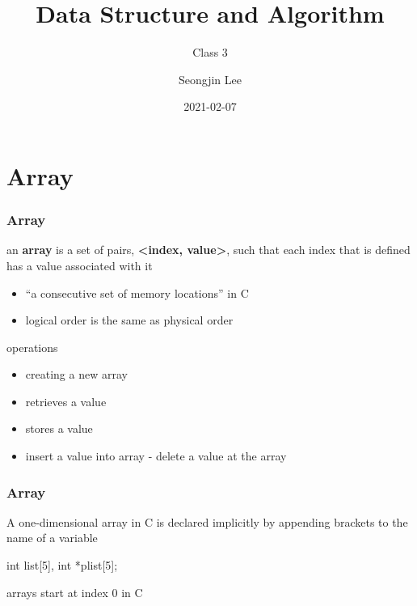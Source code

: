\documentclass[newPxFont,sthlmFooter,nooffset]{beamer}
\title{Data Structure and Algorithm}
\subtitle{Class 3}
\author[SJL]{Seongjin Lee}
\institute{\href{mailto:insight@gnu.ac.kr}{insight@gnu.ac.kr}\\\url{http://resourceful.github.io}\\Systems Research Lab.\\GNU}
\date{2021-02-07}
\begin{document}
\frame[plain,t]{\titlepage} 



\section{Array} 
\begin{frame}[t]
  \frametitle{Array}
an \textbf{array} is a set of pairs, \textbf{<index, value>}, such that each index that is defined has a value associated with it
\begin{itemize}
\item  ``a consecutive set of memory locations'' in C
\item  logical order is the same as physical order
\end{itemize}

operations
\begin{itemize}
\item creating a new array
\item retrieves a value
\item stores a value
\item insert a value into array - delete a value at the array
\end{itemize}

\end{frame}

\begin{frame}[t, fragile]
  \frametitle{Array}
A one-dimensional array in C is declared implicitly by appending brackets to the name of a variable

\begin{codedef}
  int list[5], int *plist[5];
\end{codedef}

arrays start at index 0 in C  
\end{frame}
\end{document}
